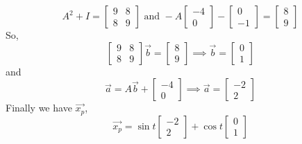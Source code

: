 \begin{equation*}
	A^2 + I = \begin{bmatrix}
		9 & 8 \\
		8 & 9
	\end{bmatrix} \text{ and } -A\begin{bmatrix}
	-4 \\
	0
	\end{bmatrix} - \begin{bmatrix}
	0 \\
	-1
	\end{bmatrix} = \begin{bmatrix}
		8 \\
		9
	\end{bmatrix}
\end{equation*}
So,
\begin{equation*}
	\begin{bmatrix}
		9 & 8 \\
		8 & 9
	\end{bmatrix}\vec{b} = \begin{bmatrix}
		8 \\
		9
	\end{bmatrix} \implies \vec{b} = \begin{bmatrix}
		0 \\
		1
	\end{bmatrix}
\end{equation*}
and
\begin{equation*}
	\vec{a} = A\vec{b} + \begin{bmatrix}
		-4 \\
		0
	\end{bmatrix} \implies \vec{a} = \begin{bmatrix}
		-2 \\
		2
	\end{bmatrix}
\end{equation*}
Finally we have $\vec{x_p}$,
\begin{equation*}
	\vec{x_p} = \sin{t}\begin{bmatrix}
		-2 \\
		2
	\end{bmatrix} + \cos{t}\begin{bmatrix}
		0 \\
		1
	\end{bmatrix}
\end{equation*}